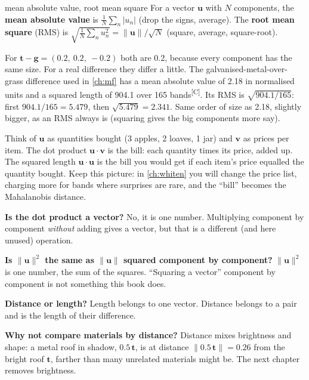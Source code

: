 \documentclass[11pt,a4paper,oneside,openany]{book}
\newcommand{\B}[1]{{\symbf{#1}}}
\newcommand{\B}[1]{{\bm{#1}}}
\newcommand{\comp}{\textsuperscript{\textsf{\scriptsize[C]}}}
\newcommand{\nrm}[1]{\lVert #1\rVert}
\newcommand{\vt}{\B{t}}
\newcommand{\vu}{\B{u}}
\newcommand{\vv}{\B{v}}
\newcommand{\vg}{\B{g}}
\begin{document}
\begin{defn}{mean absolute value, root mean square}
For a vector $\vu$ with $N$ components, the \textbf{mean absolute value} is $\frac1N\sum_n|u_n|$ (drop the signs, average).
The \textbf{root mean square} (RMS) is $\sqrt{\frac1N\sum_n u_n^2}=\nrm{\vu}/\sqrt{N}$ (square, average, square-root).
\end{defn}

For $\vt-\vg=(0.2,\ 0.2,\ -0.2)$ both are 0.2, because every component has the same size. For a real difference they
differ a little. The galvanised-metal-over-grass difference used in \cref{ch:mf} has a mean absolute value of 2.18 in
normalised units and a squared length of 904.1 over 165 bands\comp. Its RMS is $\sqrt{904.1/165}$: first
$904.1/165=5.479$, then $\sqrt{5.479}=2.341$. Same order of size as 2.18, slightly bigger, as an RMS always is (squaring
gives the big components more say).

\begin{analogy}
Think of $\vu$ as quantities bought (3 apples, 2 loaves, 1 jar) and $\vv$ as prices per item. The dot product
$\vu\cdot\vv$ is the bill: each quantity times its price, added up. The squared length $\vu\cdot\vu$ is the bill you would
get if each item's price equalled the quantity bought. Keep this picture: in \cref{ch:whiten} you will change the price
list, charging more for bands where surprises are rare, and the ``bill'' becomes the Mahalanobis distance.
\end{analogy}

\begin{confusions}
\textbf{Is the dot product a vector?} No, it is one number. Multiplying component by component \emph{without} adding gives
a vector, but that is a different (and here unused) operation.

\textbf{Is $\nrm{\vu}^2$ the same as $\nrm{\vu}$ squared component by component?} $\nrm{\vu}^2$ is one number, the sum of
the squares. ``Squaring a vector'' component by component is not something this book does.

\textbf{Distance or length?} Length belongs to one vector. Distance belongs to a pair and is the length of their
difference.

\textbf{Why not compare materials by distance?} Distance mixes brightness and shape: a metal roof in shadow, $0.5\,\vt$, is
at distance $\nrm{0.5\,\vt}=0.26$ from the bright roof $\vt$, farther than many unrelated materials might be. The next chapter
removes brightness.
\end{confusions}
\end{document}
